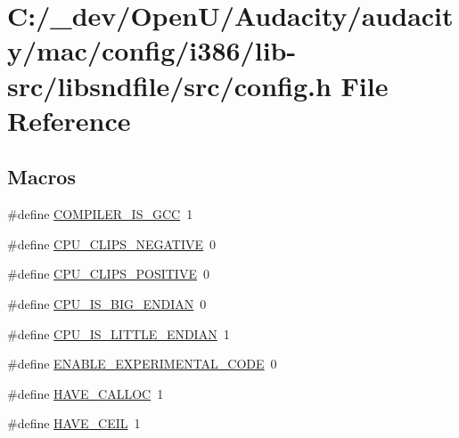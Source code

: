 \hypertarget{mac_2config_2i386_2lib-src_2libsndfile_2src_2config_8h}{}\section{C\+:/\+\_\+dev/\+Open\+U/\+Audacity/audacity/mac/config/i386/lib-\/src/libsndfile/src/config.h File Reference}
\label{mac_2config_2i386_2lib-src_2libsndfile_2src_2config_8h}
\subsection*{Macros}
\begin{DoxyCompactItemize}
\item 
\#define \hyperlink{mac_2config_2i386_2lib-src_2libsndfile_2src_2config_8h_a1effdaedfa6e430d1f91316351013267}{C\+O\+M\+P\+I\+L\+E\+R\+\_\+\+I\+S\+\_\+\+G\+CC}~1
\item 
\#define \hyperlink{mac_2config_2i386_2lib-src_2libsndfile_2src_2config_8h_a890b0d95c754812b0939c2d9c01cdeaa}{C\+P\+U\+\_\+\+C\+L\+I\+P\+S\+\_\+\+N\+E\+G\+A\+T\+I\+VE}~0
\item 
\#define \hyperlink{mac_2config_2i386_2lib-src_2libsndfile_2src_2config_8h_adcedbae5c6b15fd285667e9eb523aedb}{C\+P\+U\+\_\+\+C\+L\+I\+P\+S\+\_\+\+P\+O\+S\+I\+T\+I\+VE}~0
\item 
\#define \hyperlink{mac_2config_2i386_2lib-src_2libsndfile_2src_2config_8h_ab94a8b6379b0158c73f193e351a06c47}{C\+P\+U\+\_\+\+I\+S\+\_\+\+B\+I\+G\+\_\+\+E\+N\+D\+I\+AN}~0
\item 
\#define \hyperlink{mac_2config_2i386_2lib-src_2libsndfile_2src_2config_8h_aab66c42b3a2cd5691035648eebd7e092}{C\+P\+U\+\_\+\+I\+S\+\_\+\+L\+I\+T\+T\+L\+E\+\_\+\+E\+N\+D\+I\+AN}~1
\item 
\#define \hyperlink{mac_2config_2i386_2lib-src_2libsndfile_2src_2config_8h_ad01be93dfccd5e3109a54984ee7dbc8f}{E\+N\+A\+B\+L\+E\+\_\+\+E\+X\+P\+E\+R\+I\+M\+E\+N\+T\+A\+L\+\_\+\+C\+O\+DE}~0
\item 
\#define \hyperlink{mac_2config_2i386_2lib-src_2libsndfile_2src_2config_8h_a631f7011e0e3afd6f6732e18ea7be4ac}{H\+A\+V\+E\+\_\+\+C\+A\+L\+L\+OC}~1
\item 
\#define \hyperlink{mac_2config_2i386_2lib-src_2libsndfile_2src_2config_8h_afb1ce161af1df3c2c55a629ea0d4bb6c}{H\+A\+V\+E\+\_\+\+C\+E\+IL}~1
\item 

\end{DoxyCompactItemize}
